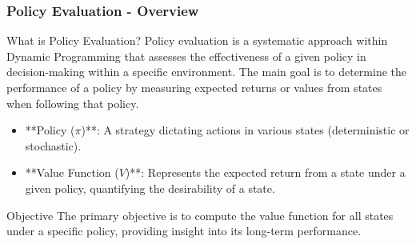 \documentclass[aspectratio=169]{beamer}
\begin{document}
\begin{frame}[fragile]
    \frametitle{Policy Evaluation - Overview}
    \begin{block}{What is Policy Evaluation?}
        Policy evaluation is a systematic approach within Dynamic Programming that assesses the effectiveness of a given policy in decision-making within a specific environment. The main goal is to determine the performance of a policy by measuring expected returns or values from states when following that policy.
    \end{block}
    
    \begin{itemize}
        \item **Policy (\(\pi\))**: A strategy dictating actions in various states (deterministic or stochastic).
        \item **Value Function (\(V\))**: Represents the expected return from a state under a given policy, quantifying the desirability of a state.
    \end{itemize}
    
    \begin{block}{Objective}
        The primary objective is to compute the value function for all states under a specific policy, providing insight into its long-term performance.
    \end{block}
\end{frame}
\end{document}
